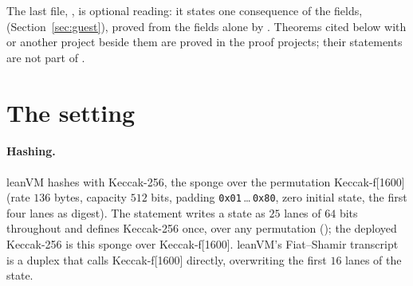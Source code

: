 \documentclass[11pt]{article}
\begin{document}
The last file, , is optional reading: it states one
consequence of the fields,  (Section~\ref{sec:guest}), proved from the
fields alone by
. Theorems cited below with  or another
project beside them are proved in the proof projects; their statements are not part of
.

\section{The setting}

\paragraph{Hashing.} leanVM hashes with Keccak-256, the sponge over the permutation
Keccak-f[1600] (rate $136$ bytes, capacity $512$ bits, padding \texttt{0x01}\,\dots\,\texttt{0x80},
zero initial state, the first four lanes as digest). The statement writes a state as $25$ lanes of
$64$ bits throughout and defines Keccak-256 once, over any permutation ();
the deployed Keccak-256 is this sponge over Keccak-f[1600]. leanVM's Fiat--Shamir transcript is a
duplex that calls Keccak-f[1600] directly, overwriting the first $16$ lanes of the state.
\end{document}
